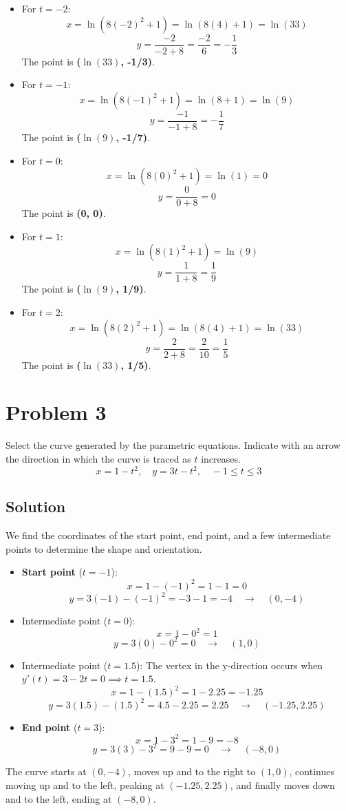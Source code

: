 \documentclass{article}
\begin{document}
\begin{itemize}
    \item For $t = -2$:
    \[ x = \ln(8(-2)^2 + 1) = \ln(8(4)+1) = \ln(33) \]
    \[ y = \frac{-2}{-2+8} = \frac{-2}{6} = -\frac{1}{3} \]
    The point is \textbf{($\ln(33)$, -1/3)}.

    \item For $t = -1$:
    \[ x = \ln(8(-1)^2 + 1) = \ln(8+1) = \ln(9) \]
    \[ y = \frac{-1}{-1+8} = -\frac{1}{7} \]
    The point is \textbf{($\ln(9)$, -1/7)}.

    \item For $t = 0$:
    \[ x = \ln(8(0)^2 + 1) = \ln(1) = 0 \]
    \[ y = \frac{0}{0+8} = 0 \]
    The point is \textbf{(0, 0)}.

    \item For $t = 1$:
    \[ x = \ln(8(1)^2 + 1) = \ln(9) \]
    \[ y = \frac{1}{1+8} = \frac{1}{9} \]
    The point is \textbf{($\ln(9)$, 1/9)}.

    \item For $t = 2$:
    \[ x = \ln(8(2)^2 + 1) = \ln(8(4)+1) = \ln(33) \]
    \[ y = \frac{2}{2+8} = \frac{2}{10} = \frac{1}{5} \]
    The point is \textbf{($\ln(33)$, 1/5)}.
\end{itemize}

\section{Problem 3}
Select the curve generated by the parametric equations. Indicate with an arrow the direction in which the curve is traced as $t$ increases.
\[ x = 1 - t^2, \quad y = 3t - t^2, \quad -1 \le t \le 3 \]

\subsection*{Solution}
We find the coordinates of the start point, end point, and a few intermediate points to determine the shape and orientation.
\begin{itemize}
    \item \textbf{Start point} ($t = -1$):
    \[ x = 1 - (-1)^2 = 1 - 1 = 0 \]
    \[ y = 3(-1) - (-1)^2 = -3 - 1 = -4 \quad \rightarrow \quad (0, -4) \]
    \item Intermediate point ($t = 0$):
    \[ x = 1 - 0^2 = 1 \]
    \[ y = 3(0) - 0^2 = 0 \quad \rightarrow \quad (1, 0) \]
    \item Intermediate point ($t = 1.5$):
    The vertex in the y-direction occurs when $y'(t) = 3 - 2t = 0 \implies t = 1.5$.
    \[ x = 1 - (1.5)^2 = 1 - 2.25 = -1.25 \]
    \[ y = 3(1.5) - (1.5)^2 = 4.5 - 2.25 = 2.25 \quad \rightarrow \quad (-1.25, 2.25) \]
    \item \textbf{End point} ($t = 3$):
    \[ x = 1 - 3^2 = 1 - 9 = -8 \]
    \[ y = 3(3) - 3^2 = 9 - 9 = 0 \quad \rightarrow \quad (-8, 0) \]
\end{itemize}
The curve starts at $(0, -4)$, moves up and to the right to $(1, 0)$, continues moving up and to the left, peaking at $(-1.25, 2.25)$, and finally moves down and to the left, ending at $(-8, 0)$.
\end{document}
